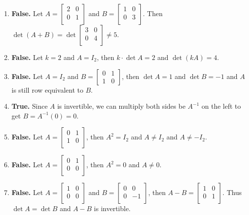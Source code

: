 \documentclass[12pt,letterpaper]{article}
\begin{document}
\begin{enumerate}

  \Answer 
  
  \begin{enumerate}
  \item {\bf False.} Let $A=\begin{bmatrix} 2 & 0\\ 0 & 1\\ \end{bmatrix}$ and $B=\begin{bmatrix} 1 & 0\\ 0 & 3\\ \end{bmatrix}$. Then $\det{(A+B)} = \det \begin{bmatrix} 3  & 0\\ 0 & 4\\ \end{bmatrix}\neq 5$.
  
  \item {\bf False.} Let $k=2$ and $A=I_2$, then $k\cdot \det{A}=2$ and $\det{(kA)}=4$.
  
  \item {\bf False.} Let $A=I_2$ and $B=\begin{bmatrix} 0 & 1\\ 1 & 0\end{bmatrix}$, then $\det{A}=1$ and $\det{B}=-1$ and $A$ is still row equivalent to $B$.
  
  \item {\bf True.} Since $A$ is invertible, we can multiply both sides be $A^{-1}$ on the left to get $B=A^{-1} (0)=0$.
  
  \item {\bf False.} Let $A=\begin{bmatrix} 0 & 1\\ 1 & 0\\ \end{bmatrix}$, then $A^2=I_2$ and $A\neq I_2$ and $A\neq -I_2$.
  
  \item {\bf False.} Let $A=\begin{bmatrix} 0 & 1\\ 0 & 0\\ \end{bmatrix}$, then $A^2=0$ and $A\neq 0$.
  
  \item {\bf False.} Let $A=\begin{bmatrix} 1 & 0\\ 0 & 0\\ \end{bmatrix}$ and $B=\begin{bmatrix} 0 & 0\\ 0 &-1\\ \end{bmatrix}$, then $A-B=\begin{bmatrix} 1 &0 \\ 0 & 1\\ \end{bmatrix}$. Thus $\det{A}=\det{B}$ and $A-B$ is invertible.
  

\end{enumerate}
\end{enumerate}
\end{document}
